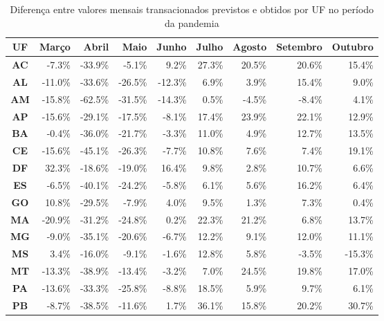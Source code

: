 \begin{table}[htb]
\centering
\caption{Diferença entre valores mensais transacionados previstos e obtidos por UF no período da pandemia}
\label{tab:pandemia:variacao-mensal-por-uf}
    \begin{tabular}{c|r|r|r|r|r|r|r|r}
        \toprule
        \textbf{UF} & Março & Abril & Maio & Junho & Julho & Agosto & Setembro & Outubro \\
        \midrule
        \textbf{AC} &  -7.3\% & -33.9\% &  -5.1\% &   9.2\% &   27.3\% &    20.5\% &    20.6\% &   15.4\% \\
        \textbf{AL} & -11.0\% & -33.6\% & -26.5\% & -12.3\% &    6.9\% &     3.9\% &    15.4\% &    9.0\% \\
        \textbf{AM} & -15.8\% & -62.5\% & -31.5\% & -14.3\% &    0.5\% &    -4.5\% &    -8.4\% &    4.1\% \\
        \textbf{AP} & -15.6\% & -29.1\% & -17.5\% &  -8.1\% &   17.4\% &    23.9\% &    22.1\% &   12.9\% \\
        \textbf{BA} &  -0.4\% & -36.0\% & -21.7\% &  -3.3\% &   11.0\% &     4.9\% &    12.7\% &   13.5\% \\
        \textbf{CE} & -15.6\% & -45.1\% & -26.3\% &  -7.7\% &   10.8\% &     7.6\% &     7.4\% &   19.1\% \\
        \textbf{DF} &  32.3\% & -18.6\% & -19.0\% &  16.4\% &    9.8\% &     2.8\% &    10.7\% &    6.6\% \\
        \textbf{ES} &  -6.5\% & -40.1\% & -24.2\% &  -5.8\% &    6.1\% &     5.6\% &    16.2\% &    6.4\% \\
        \textbf{GO} &  10.8\% & -29.5\% &  -7.9\% &   4.0\% &    9.5\% &     1.3\% &     7.3\% &    0.4\% \\
        \textbf{MA} & -20.9\% & -31.2\% & -24.8\% &   0.2\% &   22.3\% &    21.2\% &     6.8\% &   13.7\% \\
        \textbf{MG} &  -9.0\% & -35.1\% & -20.6\% &  -6.7\% &   12.2\% &     9.1\% &    12.0\% &   11.1\% \\
        \textbf{MS} &   3.4\% & -16.0\% &  -9.1\% &  -1.6\% &   12.8\% &     5.8\% &    -3.5\% &  -15.3\% \\
        \textbf{MT} & -13.3\% & -38.9\% & -13.4\% &  -3.2\% &    7.0\% &    24.5\% &    19.8\% &   17.0\% \\
        \textbf{PA} & -13.6\% & -33.3\% & -25.8\% &  -8.8\% &   18.5\% &     5.9\% &     9.7\% &    6.1\% \\
        \textbf{PB} &  -8.7\% & -38.5\% & -11.6\% &   1.7\% &   36.1\% &    15.8\% &    20.2\% &   30.7\% \\

\end{tabular}
\end{table}
